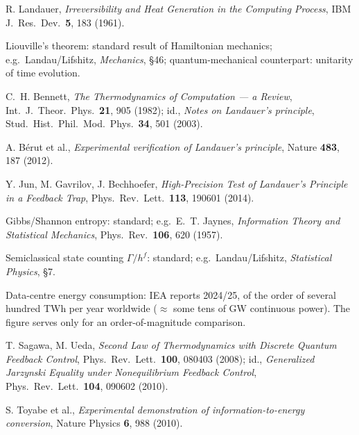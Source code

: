 \begingroup
\small
\begin{description}[leftmargin=3.2em,style=sameline,itemsep=0.3em]

\item[{[B1]}] R. Landauer, \emph{Irreversibility and Heat Generation in the
Computing Process}, IBM J.\ Res.\ Dev.\ \textbf{5}, 183 (1961).

\item[{[B2]}] Liouville's theorem: standard result of Hamiltonian mechanics; e.g.\
Landau/Lifshitz, \emph{Mechanics}, §46; quantum-mechanical counterpart: unitarity
of time evolution.

\item[{[B3]}] C.~H. Bennett, \emph{The Thermodynamics of Computation --- a
Review}, Int.\ J.\ Theor.\ Phys.\ \textbf{21}, 905 (1982); id., \emph{Notes on
Landauer's principle}, Stud.\ Hist.\ Phil.\ Mod.\ Phys.\ \textbf{34}, 501 (2003).

\item[{[B4]}] A. Bérut et al., \emph{Experimental verification of Landauer's
principle}, Nature \textbf{483}, 187 (2012).

\item[{[B5]}] Y. Jun, M. Gavrilov, J. Bechhoefer, \emph{High-Precision Test of
Landauer's Principle in a Feedback Trap}, Phys.\ Rev.\ Lett.\ \textbf{113},
190601 (2014).

\item[{[B6]}] Gibbs/Shannon entropy: standard; e.g.\ E.~T. Jaynes,
\emph{Information Theory and Statistical Mechanics}, Phys.\ Rev.\ \textbf{106},
620 (1957).

\item[{[B7]}] Semiclassical state counting $\Gamma/h^f$: standard; e.g.\
Landau/Lifshitz, \emph{Statistical Physics}, §7.

\item[{[B8]}] Data-centre energy consumption: IEA reports 2024/25, of the order of
several hundred TWh per year worldwide ($\approx$ some tens of GW continuous
power). The figure serves only for an order-of-magnitude comparison.

\item[{[B9]}] T. Sagawa, M. Ueda, \emph{Second Law of Thermodynamics with
Discrete Quantum Feedback Control}, Phys.\ Rev.\ Lett.\ \textbf{100}, 080403
(2008); id., \emph{Generalized Jarzynski Equality under Nonequilibrium Feedback
Control}, Phys.\ Rev.\ Lett.\ \textbf{104}, 090602 (2010).

\item[{[B10]}] S. Toyabe et al., \emph{Experimental demonstration of
information-to-energy conversion}, Nature Physics \textbf{6}, 988 (2010).


\end{description}
